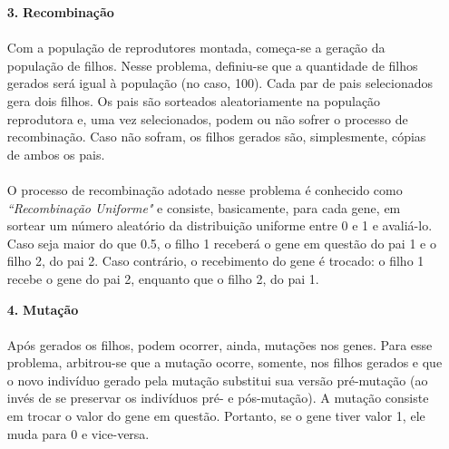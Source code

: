 \documentclass{report}
\begin{document}
\begin{itemize}
		\item[\textbf{3.}] \textbf{Recombinação}
		
		\paragraph{} Com a população de reprodutores montada, começa-se a geração da população de filhos. Nesse problema, definiu-se que a quantidade de filhos gerados será igual à população (no caso, 100). Cada par de pais selecionados gera dois filhos. Os pais são sorteados aleatoriamente na população reprodutora e, uma vez selecionados, podem ou não sofrer o processo de recombinação. Caso não sofram, os filhos gerados são, simplesmente, cópias de ambos os pais.\\
		

		\paragraph{} O processo de recombinação adotado nesse problema é conhecido como \emph{``Recombinação Uniforme"} e consiste, basicamente, para cada gene, em sortear um número aleatório da distribuição uniforme entre 0 e 1 e avaliá-lo. Caso seja maior do que 0.5, o filho 1 receberá o gene em questão do pai 1 e o filho 2, do pai 2. Caso contrário, o recebimento do gene é trocado: o filho 1 recebe o gene do pai 2, enquanto que o filho 2, do pai 1.\\
		
		\item[\textbf{4.}] \textbf{Mutação}
		
		\paragraph{} Após gerados os filhos, podem ocorrer, ainda, mutações nos genes. Para esse problema, arbitrou-se que a mutação ocorre, somente, nos filhos gerados e que o novo indivíduo gerado pela mutação substitui sua versão pré-mutação (ao invés de se preservar os indivíduos pré- e pós-mutação). A mutação consiste em trocar o valor do gene em questão. Portanto, se o gene tiver valor 1, ele muda para 0 e vice-versa.\\
		

\end{itemize}
\end{document}
